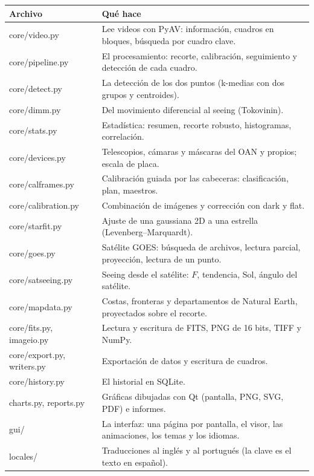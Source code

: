 \begin{center}\small
\begin{tabularx}{\linewidth}{@{}>{\ttfamily\color{acentoosc}}l Y@{}}
\toprule
\normalfont Archivo & Qué hace\\
\midrule
core/video.py & Lee videos con PyAV: información, cuadros en bloques, búsqueda por cuadro clave.\\
core/pipeline.py & El procesamiento: recorte, calibración, seguimiento y detección de cada cuadro.\\
core/detect.py & La detección de los dos puntos (k-medias con dos grupos y centroides).\\
core/dimm.py & Del movimiento diferencial al seeing (Tokovinin).\\
core/stats.py & Estadística: resumen, recorte robusto, histogramas, correlación.\\
core/devices.py & Telescopios, cámaras y máscaras del OAN y propios; escala de placa.\\
core/calframes.py & Calibración guiada por las cabeceras: clasificación, plan, maestros.\\
core/calibration.py & Combinación de imágenes y corrección con dark y flat.\\
core/starfit.py & Ajuste de una gaussiana 2D a una estrella (Levenberg–Marquardt).\\
core/goes.py & Satélite GOES: búsqueda de archivos, lectura parcial, proyección, lectura de un punto.\\
core/satseeing.py & Seeing desde el satélite: $F$, tendencia, Sol, ángulo del satélite.\\
core/mapdata.py & Costas, fronteras y departamentos de Natural Earth, proyectados sobre el recorte.\\
core/fits.py, imageio.py & Lectura y escritura de FITS, PNG de 16 bits, TIFF y NumPy.\\
core/export.py, writers.py & Exportación de datos y escritura de cuadros.\\
core/history.py & El historial en SQLite.\\
charts.py, reports.py & Gráficas dibujadas con Qt (pantalla, PNG, SVG, PDF) e informes.\\
gui/ & La interfaz: una página por pantalla, el visor, las animaciones, los temas y los idiomas.\\
locales/ & Traducciones al inglés y al portugués (la clave es el texto en español).\\
\bottomrule
\end{tabularx}
\end{center}

